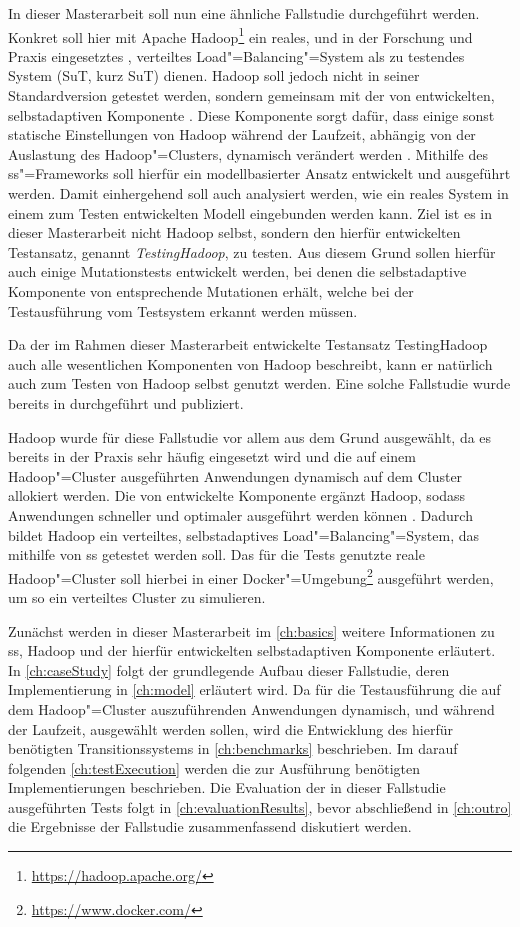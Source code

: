 In dieser Masterarbeit soll nun eine ähnliche Fallstudie durchgeführt werden.
Konkret soll hier mit Apache Hadoop\footnote{\url{https://hadoop.apache.org/}} ein reales, und in der Forschung und Praxis eingesetztes \cite{PoweredByHadoop}, verteiltes Load"=Balancing"=System als zu testendes System (\acrlong{SuT}, kurz \acrshort{SuT}) dienen.
Hadoop soll jedoch nicht in seiner Standardversion getestet werden, sondern gemeinsam mit der von \citeauthor{Zhang2016} entwickelten, selbstadaptiven Komponente \cite{Zhang2016}.
Diese Komponente sorgt dafür, dass einige sonst statische Einstellungen von Hadoop während der Laufzeit, abhängig von der Auslastung des Hadoop"=Clusters, dynamisch verändert werden \cite{Zhang2016}.
Mithilfe des \gls{ss}"=Frameworks soll hierfür ein modellbasierter Ansatz entwickelt und ausgeführt werden.
Damit einhergehend soll auch analysiert werden, wie ein reales System in einem zum Testen entwickelten Modell eingebunden werden kann.
Ziel ist es in dieser Masterarbeit nicht Hadoop selbst, sondern den hierfür entwickelten Testansatz, genannt \emph{TestingHadoop}, zu testen.
Aus diesem Grund sollen hierfür auch einige Mutationstests entwickelt werden, bei denen die selbstadaptive Komponente von \citeauthor{Zhang2016} entsprechende Mutationen erhält, welche bei der Testausführung vom Testsystem erkannt werden müssen.

Da der im Rahmen dieser Masterarbeit entwickelte Testansatz TestingHadoop auch alle wesentlichen Komponenten von Hadoop beschreibt, kann er natürlich auch zum Testen von Hadoop selbst genutzt werden.
Eine solche Fallstudie wurde bereits in \cite{Eberhardinger2018} durchgeführt und publiziert.

Hadoop wurde für diese Fallstudie vor allem aus dem Grund ausgewählt, da es bereits in der Praxis sehr häufig eingesetzt wird \cite{PoweredByHadoop} und die auf einem Hadoop"=Cluster ausgeführten Anwendungen dynamisch auf dem Cluster allokiert werden.
Die von \citeauthor{Zhang2016} entwickelte Komponente ergänzt Hadoop, sodass Anwendungen schneller und optimaler ausgeführt werden können \cite{Zhang2016}.
Dadurch bildet Hadoop ein verteiltes, selbstadaptives Load"=Balancing"=System, das mithilfe von \gls{ss} getestet werden soll.
Das für die Tests genutzte reale Hadoop"=Cluster soll hierbei in einer Docker"=Umgebung\footnote{\url{https://www.docker.com/}} ausgeführt werden, um so ein verteiltes Cluster zu simulieren.

Zunächst werden in dieser Masterarbeit im \cref{ch:basics} weitere Informationen zu \gls{ss}, Hadoop und der hierfür entwickelten selbstadaptiven Komponente erläutert.
In \cref{ch:caseStudy} folgt der grundlegende Aufbau dieser Fallstudie, deren Implementierung in \cref{ch:model} erläutert wird.
Da für die Testausführung die auf dem Hadoop"=Cluster auszuführenden Anwendungen dynamisch, und während der Laufzeit, ausgewählt werden sollen, wird die Entwicklung des hierfür benötigten Transitionssystems in \cref{ch:benchmarks} beschrieben.
Im darauf folgenden \cref{ch:testExecution} werden die zur Ausführung benötigten Implementierungen beschrieben.
Die Evaluation der in dieser Fallstudie ausgeführten Tests folgt in \cref{ch:evaluationResults}, bevor abschließend in \cref{ch:outro} die Ergebnisse der Fallstudie zusammenfassend diskutiert werden.
